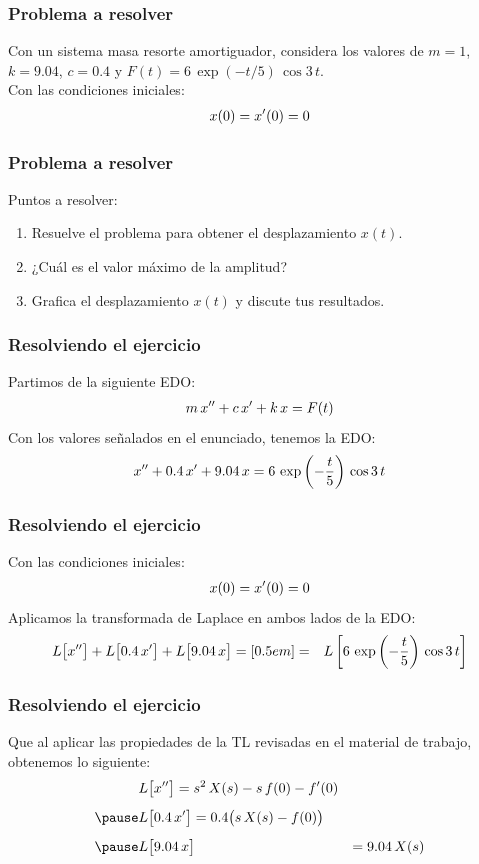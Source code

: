 \begin{frame}
\frametitle{Problema a resolver}
Con un sistema masa resorte amortiguador, considera los valores de $m = 1$, $k = 9.04$, $c= 0.4$ y $F(t) =  6 \, \exp(-t/5) \, \cos 3 \, t$.
\\
\bigskip
\pause
Con las condiciones iniciales:
\pause
\begin{align*}
x(0) = {x}^{\prime}(0) = 0
\end{align*}
\end{frame}
\begin{frame}
\frametitle{Problema a resolver}    
Puntos a resolver:
\pause
{}
\begin{enumerate}[<+->]
\item Resuelve el problema para obtener el desplazamiento $x(t)$.
\item ¿Cuál es el valor máximo de la amplitud?
\item Grafica el desplazamiento $x(t)$ y discute tus resultados.
\end{enumerate}
\end{frame}
\begin{frame}
\frametitle{Resolviendo el ejercicio}
Partimos de la siguiente EDO:
\pause
\begin{align*}
m \, {x}^{\prime \prime} + c \, {x}^{\prime} + k \, x = F(t)
\end{align*}
\pause
Con los valores señalados en el enunciado, tenemos la EDO:
\pause
\begin{align*}
{x}^{\prime \prime} + 0.4 \, {x}^{\prime} + 9.04 \, x = 6 \, \exp\left( -\dfrac{t}{5}\right) \, \cos 3 \, t
\end{align*}
\end{frame}
\begin{frame}
\frametitle{Resolviendo el ejercicio}
Con las condiciones iniciales:
\pause
\begin{align*}
x(0) = {x}^{\prime}(0) = 0
\end{align*}
\pause
Aplicamos la transformada de Laplace en ambos lados de la EDO:
\pause
\begin{align*}
L \big[{x}^{\prime \prime}\big] &+ L\big[0.4 \, {x}^{\prime}\big] + L \big[9.04 \, x\big] = [0.5em]
=& L \left[ 6 \, \exp \left( -\dfrac{t}{5}\right) \, \cos 3 \, t \right]
\end{align*}
\end{frame}
\begin{frame}
\frametitle{Resolviendo el ejercicio}
Que al aplicar las propiedades de la TL revisadas en el material de trabajo, obtenemos lo siguiente:
\pause
\begin{eqnarray*}
\begin{aligned}
&L \big[\stilde{x}\big] = s^{2} \, X(s) - s \, f(0) - \ptilde{f}(0) \\[0.5em] \pause 
&L \big[0.4 \, \ptilde{x}\big] = 0. 4 \big( s \, X(s) - f(0)\big) \\[0.5em] \pause 
&L \big[9.04 \, x\big] &= 9.04 \, X(s)
\end{aligned}
\end{eqnarray*}
\end{frame}
